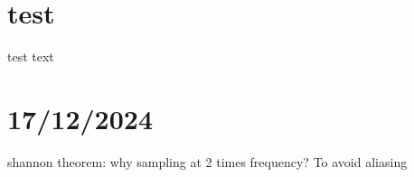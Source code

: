 \section{test}
\label{sec:test}

test text

\section{17/12/2024}

shannon theorem: why sampling at 2 times frequency? To avoid aliasing